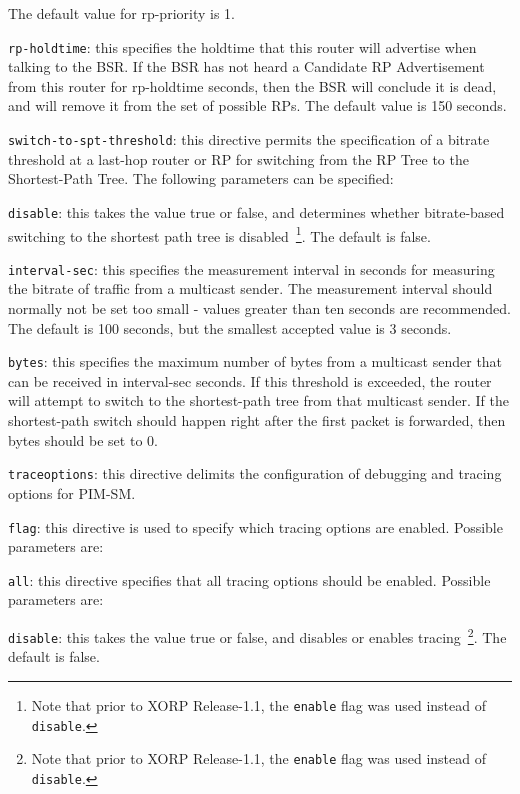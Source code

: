 \begin{description}
\begin{description}
\begin{description}
  The default value for {\stt rp-priority} is 1.
\item{\tt rp-holdtime}: this specifies the holdtime that this router
  will advertise when talking to the BSR.  If the BSR has not heard a
  Candidate RP Advertisement from this router for {\stt rp-holdtime}
  seconds, then the BSR will conclude it is dead, and will remove it
  from the set of possible RPs.  The default value is 150 seconds.
\end{description}
\end{description}
\item{\tt switch-to-spt-threshold}: this directive permits the
  specification of a bitrate threshold at a last-hop router or RP
  for switching from the RP Tree to the Shortest-Path Tree.  The
  following parameters can be specified:
\begin{description}
\item{\tt disable}: this takes the value {\stt true} or {\stt false},
  and determines whether bitrate-based switching to the shortest
  path tree is disabled~\footnote{Note
  that prior to XORP Release-1.1, the {\tt enable} flag was used instead of
  {\tt disable}.}.  The default is false.
\item{\tt interval-sec}: this specifies the measurement interval in
  seconds for measuring the bitrate of traffic from a  multicast
  sender.  The measurement interval should normally not be set too
  small - values greater than ten seconds are recommended.  The
  default is 100 seconds, but the smallest accepted value is 3 seconds.
\item{\tt bytes}: this specifies the maximum number of bytes from a
  multicast sender that can be received in {\stt interval-sec}
  seconds.  If this threshold is exceeded, the router will attempt to
  switch to the shortest-path tree from that multicast sender.
  If the shortest-path switch should happen right after the first packet
  is forwarded, then {\stt bytes} should be set to 0.
\end{description}
\item{\tt traceoptions}: this directive delimits the configuration of
  debugging and tracing options for PIM-SM.
\begin{description}
\item{\tt flag}: this directive is used to specify which tracing
  options are enabled.  Possible parameters are:
\begin{description}
\item{\tt all}: this directive specifies that all tracing
  options should be enabled.  Possible parameters are:
\begin{description}
\item{\tt disable}: this takes the value {\stt true} or {\stt false},
  and disables or enables tracing~\footnote{Note
  that prior to XORP Release-1.1, the {\tt enable} flag was used instead of
  {\tt disable}.}. The default is {\stt false}.
\end{description}
\end{description}
\end{description}
\end{description}


